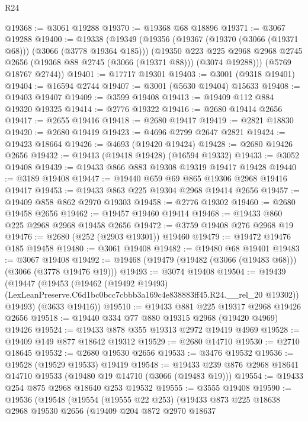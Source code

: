 \begin{lexlean}{R24}
\begin{coremodule}
@19368 := @3061 @19288
@19370 := @19368 @68 @18896
@19371 := @3067 @19288
@19400 := @19338
    (@19349
      (@19356
        (@19367 (@19370 (@3066 (@19371 @68))) (@3066 (@3778 @19364 @185)))
        (@19350
          @223
          @225
          @2968
          @2968
          @2745
          @2656
          (@19368 @88 @2745 (@3066 (@19371 @88)))
          (@3074 @19288)))
      (@5769 @18767 @2744))
@19401 := @17717 @19301
@19403 := @3001 (@9318 @19401)
@19404 := @16594 @2744
@19407 := @3001 (@5630 @19404) @15633
@19408 := @19403 @19407
@19409 := @3599 @19408
@19413 := @19409 @112 @884 @19320 @19325
@19414 := @2776 @19322
@19416 := @2680 @19414 @2656
@19417 := @2655 @19416
@19418 := @2680 @19417
@19419 := @2821 @18830
@19420 := @2680 @19419
@19423 := @4696 @2799 @2647 @2821
@19424 := @19423 @18664
@19426 := @4693 (@19420 @19424)
@19428 := @2680 @19426 @2656
@19432 := @19413 (@19418 @19428) (@16594 @19332)
@19433 := @3052 @19408
@19439 := @19433 @866 @883 @19308 @19319 @19417 @19428
@19440 := @3189 @19408
@19447 := @19440 @659 @69 @865 @19306 @2968 @19416 @19417
@19453 := @19433 @863 @225 @19304 @2968 @19414 @2656
@19457 := @19409 @858 @862 @2970 @19303
@19458 := @2776 @19302
@19460 := @2680 @19458 @2656
@19462 := @19457 @19460 @19414
@19468 := @19433 @860 @225 @2968 @2968 @19458 @2656
@19472 := @3759 @19408 @276 @2968 @19
@19476 := @2680 (@252 (@2903 @19301)) @19460
@19479 := @19472 @19476 @185 @19458
@19480 := @3061 @19408
@19482 := @19480 @68 @19401
@19483 := @3067 @19408
@19492 := @19468 (@19479 (@19482 (@3066 (@19483 @68))) (@3066 (@3778 @19476 @19)))
@19493 := @3074 @19408
@19504 := @19439
    (@19447
      (@19453
        (@19462
          (@19492 @19493)
          (LexLeanPreserve.C6d1bc0bcc7cbbb3a169c4e838883ff45.R24.__rel_20 @19302))
        @19493)
      (@3633 @19416))
@19510 := @19433 @881 @225 @19317 @2968 @19426 @2656
@19518 := @19440 @334 @77 @880 @19315 @2968 (@19420 @4969) @19426
@19524 := @19433 @878 @355 @19313 @2972 @19419 @4969
@19528 := @19409 @149 @877 @18642 @19312
@19529 := @2680 @14710
@19530 := @2710 @18645
@19532 := @2680 @19530 @2656
@19533 := @3476 @19532
@19536 := @19528 (@19529 @19533) @19419
@19548 := @19433 @239 @876 @2968 @18641 @14710 @19533 (@19480 @19 @14710 (@3066 (@19483 @19)))
@19554 := @19433 @254 @875 @2968 @18640 @253 @19532
@19555 := @3555 @19408
@19590 := @19536
    (@19548
      (@19554
        (@19555 @22 @253)
        (@19433
          @873
          @225
          @18638
          @2968
          @19530
          @2656
          (@19409
            @204
            @872
            @2970
            @18637

\end{coremodule}
\end{lexlean}
